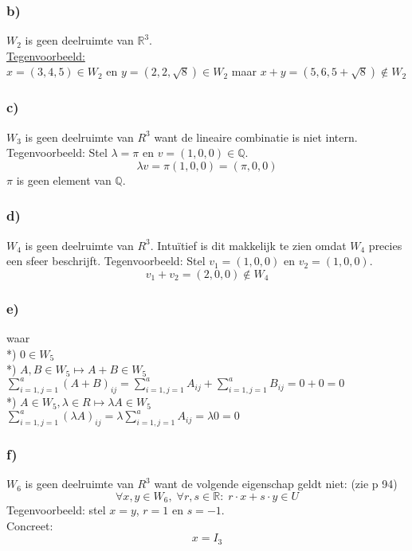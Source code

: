 \documentclass[lineaire_algebra_oplossingen.tex]{subfiles}
\begin{document}
\subsubsection*{b)}
$W_2$ is geen deelruimte van $\mathbb{R}^{3}$.\\
\underline{Tegenvoorbeeld:}\\
$x = (3, 4, 5) \in W_2$ en $y = (2, 2, \sqrt{8}) \in W_2$ maar $x + y = (5, 6, 5 + \sqrt{8}) \not \in W_2$

\subsubsection*{c)}
$W_3$ is geen deelruimte van $R^3$ want de lineaire combinatie is niet intern.\\
Tegenvoorbeeld: Stel $\lambda = \pi$ en $v = (1,0,0) \in \mathbb{Q}$.
\[
\lambda v = \pi (1,0,0) = (\pi,0,0)
\]
$\pi$ is geen element van $\mathbb{Q}$.

\subsubsection*{d)}
$W_4$ is geen deelruimte van $R^3$. Intu\"itief is dit makkelijk te zien omdat $W_4$ precies een sfeer beschrijft.
Tegenvoorbeeld: Stel $v_1 = (1,0,0)$ en $v_2 =(1,0,0)$.
\[
v_1 + v_2 = (2,0,0) \not \in W_4
\]

\subsubsection*{e)}
waar\\
*) $0 \in W_5$ \\
*) $A,B \in W_5 \longmapsto A+B \in W_5$ \\
$ \sum\limits_{i=1,j=1}^a (A+B)_{ij} = \sum\limits_{i=1,j=1}^a A_{ij} + \sum\limits_{i=1,j=1}^a B_{ij} = 0+0 = 0 $ \\
*) $ A \in W_5, \lambda \in R \longmapsto \lambda A \in W_5$ \\
$ \sum\limits_{i=1,j=1}^a (\lambda A)_{ij} = \lambda \sum\limits_{i=1,j=1}^a A_{ij} = \lambda 0 = 0$


\subsubsection*{f)}
$W_6$ is geen deelruimte van $R^{3}$ want de volgende eigenschap geldt niet: (zie p 94)
\[
\forall x,y\in W_6,\;\forall r,s\in\mathbb{R}:\; r\cdot x+s\cdot y\in U
\]
Tegenvoorbeeld:
stel $x=y$, $r=1$ en $s=-1$.\\
Concreet:
\[
x = I_3
\]
\end{document}
